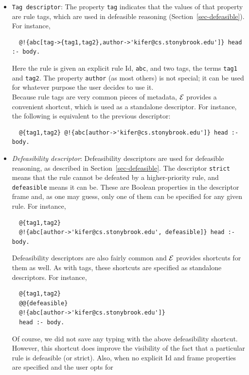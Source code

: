 \documentclass[11pt]{article}
\newcommand{\ERGO}{\mbox{\ensuremath{\cal{E}}\smaller{{\sc{RGO}}}}\xspace}
\newcommand{\FLSYSTEM}{\ERGO}
\begin{document}
\begin{itemize}
\item \texttt{Tag descriptor}:
  The property \texttt{tag} indicates that the values of that property are
  rule tags, which are used in defeasible reasoning
  (Section~\ref{sec-defeasible}). For instance,
\begin{verbatim}
  @!{abc[tag->{tag1,tag2},author->'kifer@cs.stonybrook.edu']} head :- body.  
\end{verbatim}
  Here the rule is given an explicit rule Id, \texttt{abc}, and
  two tags, the terms \texttt{tag1} and
  \texttt{tag2}. The
  property \texttt{author} (as most others) is not special; it can be used
  for whatever purpose the user decides to use it.
  \\
  Because rule tags are very common pieces of metadata, \FLSYSTEM provides a
  convenient shortcut, which is used as a standalone descriptor. For
  instance, the following is equivalent to the previous descriptor:
\begin{verbatim}
  @{tag1,tag2} @!{abc[author->'kifer@cs.stonybrook.edu']} head :- body.
\end{verbatim}
\item \emph{Defeasibility descriptor}:
  Defeasibility descriptors are used for defeasible
  reasoning, as described in Section~\ref{sec-defeasible}. The descriptor
  \texttt{strict} means that the rule cannot be defeated by a
  higher-priority rule, and \texttt{defeasible} means it can be. These are
  Boolean properties in the descriptor frame and, as one may guess, only
  one of them can be specified for any given rule. For instance,
\begin{verbatim}
  @{tag1,tag2}
  @!{abc[author->'kifer@cs.stonybrook.edu', defeasible]} head :- body.
\end{verbatim}
  Defeasibility descriptors are also fairly common and \FLSYSTEM provides shortcuts for
  them as well. As with tags, these shortcuts are specified as standalone
  descriptors. For instance,
\begin{verbatim}
  @{tag1,tag2}
  @@{defeasible}
  @!{abc[author->'kifer@cs.stonybrook.edu']}
  head :- body.
\end{verbatim}
  Of course, we did not save any typing with the above defeasibility
  shortcut. However, this shortcut does improve the visibility of
  the fact that a particular rule is defeasible (or strict). Also, when no
  explicit Id and frame properties are specified and the user opts for

\end{itemize}
\end{document}
